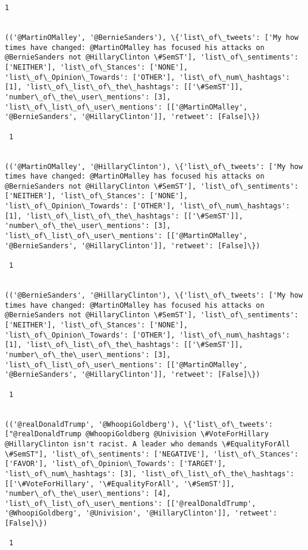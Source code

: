\documentclass[11pt]{article}
\begin{document}
\begin{Verbatim}[commandchars=\\\{\}]
 1
 

(('@MartinOMalley', '@BernieSanders'), \{'list\_of\_tweets': ['My how times have changed: @MartinOMalley has focused his attacks on @BernieSanders not @HillaryClinton \#SemST'], 'list\_of\_sentiments': ['NEITHER'], 'list\_of\_Stances': ['NONE'], 'list\_of\_Opinion\_Towards': ['OTHER'], 'list\_of\_num\_hashtags': [1], 'list\_of\_list\_of\_the\_hashtags': [['\#SemST']], 'number\_of\_the\_user\_mentions': [3], 'list\_of\_list\_of\_user\_mentions': [['@MartinOMalley', '@BernieSanders', '@HillaryClinton']], 'retweet': [False]\})

 1
 

(('@MartinOMalley', '@HillaryClinton'), \{'list\_of\_tweets': ['My how times have changed: @MartinOMalley has focused his attacks on @BernieSanders not @HillaryClinton \#SemST'], 'list\_of\_sentiments': ['NEITHER'], 'list\_of\_Stances': ['NONE'], 'list\_of\_Opinion\_Towards': ['OTHER'], 'list\_of\_num\_hashtags': [1], 'list\_of\_list\_of\_the\_hashtags': [['\#SemST']], 'number\_of\_the\_user\_mentions': [3], 'list\_of\_list\_of\_user\_mentions': [['@MartinOMalley', '@BernieSanders', '@HillaryClinton']], 'retweet': [False]\})

 1
 

(('@BernieSanders', '@HillaryClinton'), \{'list\_of\_tweets': ['My how times have changed: @MartinOMalley has focused his attacks on @BernieSanders not @HillaryClinton \#SemST'], 'list\_of\_sentiments': ['NEITHER'], 'list\_of\_Stances': ['NONE'], 'list\_of\_Opinion\_Towards': ['OTHER'], 'list\_of\_num\_hashtags': [1], 'list\_of\_list\_of\_the\_hashtags': [['\#SemST']], 'number\_of\_the\_user\_mentions': [3], 'list\_of\_list\_of\_user\_mentions': [['@MartinOMalley', '@BernieSanders', '@HillaryClinton']], 'retweet': [False]\})

 1
 

(('@realDonaldTrump', '@WhoopiGoldberg'), \{'list\_of\_tweets': ["@realDonaldTrump @WhoopiGoldberg @Univision \#VoteForHillary @HillaryClinton isn't racist. A leader who demands \#EqualityForAll \#SemST"], 'list\_of\_sentiments': ['NEGATIVE'], 'list\_of\_Stances': ['FAVOR'], 'list\_of\_Opinion\_Towards': ['TARGET'], 'list\_of\_num\_hashtags': [3], 'list\_of\_list\_of\_the\_hashtags': [['\#VoteForHillary', '\#EqualityForAll', '\#SemST']], 'number\_of\_the\_user\_mentions': [4], 'list\_of\_list\_of\_user\_mentions': [['@realDonaldTrump', '@WhoopiGoldberg', '@Univision', '@HillaryClinton']], 'retweet': [False]\})

 1
 


\end{Verbatim}
\end{document}
